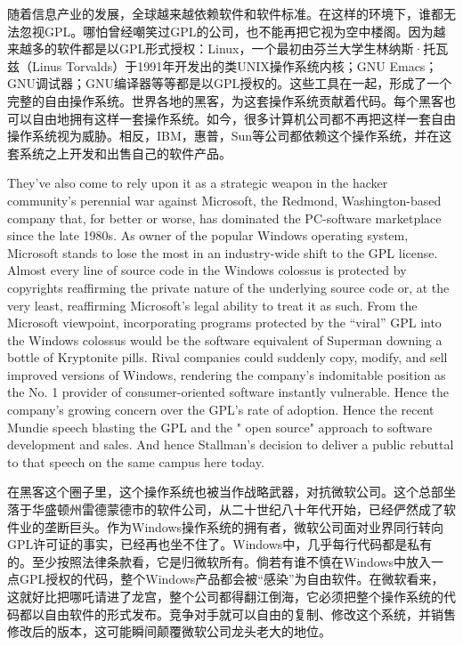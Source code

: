 \ifdefined\chs
随着信息产业的发展，全球越来越依赖软件和软件标准。在这样的环境下，谁都无法忽视GPL。哪怕曾经嘲笑过GPL的公司，也不能再把它视为空中楼阁。因为越来越多的软件都是以GPL形式授权：Linux，一个最初由芬兰大学生林纳斯·托瓦兹（Linus Torvalds）于1991年开发出的类UNIX操作系统内核；GNU Emacs；GNU调试器；GNU编译器等等都是以GPL授权的。这些工具在一起，形成了一个完整的自由操作系统。世界各地的黑客，为这套操作系统贡献着代码。每个黑客也可以自由地拥有这样一套操作系统。如今，很多计算机公司都不再把这样一套自由操作系统视为威胁。相反，IBM，惠普，Sun等公司都依赖这个操作系统，并在这套系统之上开发和出售自己的软件产品。
\fi

\ifdefined\eng
They've also come to rely upon it as a strategic weapon in the hacker community's perennial war against Microsoft, the Redmond, Washington-based company that, for better or worse, has dominated the PC-software marketplace since the late 1980s. As owner of the popular Windows operating system, Microsoft stands to lose the most in an industry-wide shift to the GPL license. Almost every line of source code in the Windows colossus is protected by copyrights reaffirming the private nature of the underlying source code or, at the very least, reaffirming Microsoft's legal ability to treat it as such. From the Microsoft viewpoint, incorporating programs protected by the ``viral'' GPL into the Windows colossus would be the software equivalent of Superman downing a bottle of Kryptonite pills. Rival companies could suddenly copy, modify, and sell improved versions of Windows, rendering the company's indomitable position as the No. 1 provider of consumer-oriented software instantly vulnerable. Hence the company's growing concern over the GPL's rate of adoption. Hence the recent Mundie speech blasting the GPL and the " open source" approach to software development and sales. And hence Stallman's decision to deliver a public rebuttal to that speech on the same campus here today.
\fi

\ifdefined\chs
在黑客这个圈子里，这个操作系统也被当作战略武器，对抗微软公司。这个总部坐落于华盛顿州雷德蒙德市的软件公司，从二十世纪八十年代开始，已经俨然成了软件业的垄断巨头。作为Windows操作系统的拥有者，微软公司面对业界同行转向GPL许可证的事实，已经再也坐不住了。Windows中，几乎每行代码都是私有的。至少按照法律条款看，它是归微软所有。倘若有谁不慎在Windows中放入一点GPL授权的代码，整个Windows产品都会被“感染”为自由软件。在微软看来，这就好比把哪吒请进了龙宫，整个公司都得翻江倒海，它必须把整个操作系统的代码都以自由软件的形式发布。竞争对手就可以自由的复制、修改这个系统，并销售修改后的版本，这可能瞬间颠覆微软公司龙头老大的地位。
\fi

